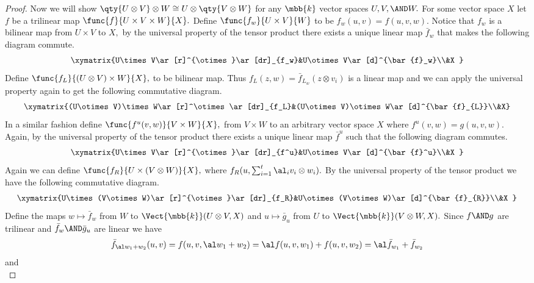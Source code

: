 \documentclass[main.tex]{subfiles}
\begin{document}
\begin{proof}
Now we will show $ \qty{U\otimes V}\otimes W\cong U\otimes\qty{V\otimes W} $ 
for any $ \mbb{k} $ vector spaces $ U,V,\AND W. $ For some vector space $ X $ 
let $ f $ be a trilinear map $ \func{f}{U\times V\times W}{X}.$ Define
$ \func{f_w}{U\times V}{W} $ to be $ f_w(u,v)=f(u,v,w).$ 
Notice that $ f_w $ is 
a bilinear map from $ U\times V $ to $ X, $ by the universal property of the 
tensor product there exists a unique linear map $ \bar{f}_w $ that makes the 
following diagram commute.
$$
\xymatrix{U\times V\ar[r]^{\otimes}\ar[dr]_{f_w}&U\otimes V\ar[d]^{\bar{f}_w}\\&X
}
$$
Define $ \func{f_L}{(U\otimes V)\times W}{X},$ 
to be bilinear map. Thus $f_L(z,w) 
=\bar{f}_{L_w}(z\otimes 
v_i)$ is a linear map and we can apply the universal property again to get the following 
commutative diagram.
$$
\xymatrix{(U\otimes V)\times W\ar[r]^\otimes\ar[dr]_{f_L}&(U\otimes V)\otimes W\ar[d]^{\bar{f}_{L}}\\&X}
$$
In a similar fashion define $ \func{f^u(v,w)}{V\times W}{X}, $ from $ V\times W $ to an arbitrary 
vector space $ X $ where $ f^u(v,w)=g(u,v,w). $ Again, by the universal 
property of the tensor product there exists a unique linear map $ \bar{f}^u $ 
such that the following diagram commutes.
$$
\xymatrix{U\times V\ar[r]^{\otimes}\ar[dr]_{f^u}&U\otimes V\ar[d]^{\bar{f}^u}\\&X
}
$$
Again we can define $ \func{f_R}{U\times(V\otimes W)}{X}, $
where $ f_R(u,\sum_{i=1}^t\al_iv_i\otimes w_i).$ By the universal property of the 
tensor product we have the following commutative diagram.
$$
\xymatrix{U\times (V\otimes W)\ar[r]^{\otimes}\ar[dr]_{f_R}&U\otimes (V\otimes W)\ar[d]^{\bar{f}_{R}}\\&X
}
$$
Define the maps $ w\mapsto \bar{f}_w  $ from $ W $ to $ \Vect{\mbb{k}} 
(U\otimes V,X)$ and $ u\mapsto \bar{g}_u $ from $ U $ to $ \Vect{\mbb{k}} 
(V\otimes W,X).$ Since $ f\AND g $ are trilinear and $\bar{f}_w \AND \bar{g}_u$ are linear we have
$$
\bar{f}_{\al w_1+w_2}(u,v)=f(u,v,\al w_1+w_2)=\al f(u,v,w_1)+f(u,v,w_2)=\al\bar{f}_{w_1}+\bar{f}_{w_2}
$$
and
$$
$$
\end{proof}
\end{document}
